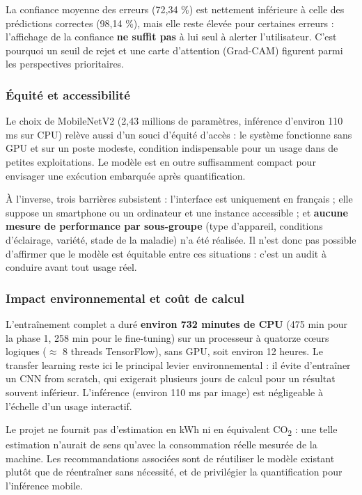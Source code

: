\documentclass[10pt,a4paper]{article}
\begin{document}
La confiance moyenne des erreurs (72,34 \%) est nettement inférieure à celle des prédictions correctes (98,14 \%), mais elle reste élevée pour certaines erreurs : l'affichage de la confiance \textbf{ne suffit pas} à lui seul à alerter l'utilisateur. C'est pourquoi un seuil de rejet et une carte d'attention (Grad-CAM) figurent parmi les perspectives prioritaires.

\subsubsection{Équité et accessibilité}

Le choix de MobileNetV2 (2,43 millions de paramètres, inférence d'environ 110 ms sur CPU) relève aussi d'un souci d'équité d'accès : le système fonctionne sans GPU et sur un poste modeste, condition indispensable pour un usage dans de petites exploitations. Le modèle est en outre suffisamment compact pour envisager une exécution embarquée après quantification.

À l'inverse, trois barrières subsistent : l'interface est uniquement en français ; elle suppose un smartphone ou un ordinateur et une instance accessible ; et \textbf{aucune mesure de performance par sous-groupe} (type d'appareil, conditions d'éclairage, variété, stade de la maladie) n'a été réalisée. Il n'est donc pas possible d'affirmer que le modèle est équitable entre ces situations : c'est un audit à conduire avant tout usage réel.

\subsubsection{Impact environnemental et coût de calcul}

L'entraînement complet a duré \textbf{environ 732 minutes de CPU} (475 min pour la phase 1, 258 min pour le fine-tuning) sur un processeur à quatorze cœurs logiques ($\approx$ 8 threads TensorFlow), sans GPU, soit environ 12 heures. Le transfer learning reste ici le principal levier environnemental : il évite d'entraîner un CNN from scratch, qui exigerait plusieurs jours de calcul pour un résultat souvent inférieur. L'inférence (environ 110 ms par image) est négligeable à l'échelle d'un usage interactif.

Le projet ne fournit pas d'estimation en kWh ni en équivalent CO\textsubscript{2} : une telle estimation n'aurait de sens qu'avec la consommation réelle mesurée de la machine. Les recommandations associées sont de réutiliser le modèle existant plutôt que de réentraîner sans nécessité, et de privilégier la quantification pour l'inférence mobile.
\end{document}
